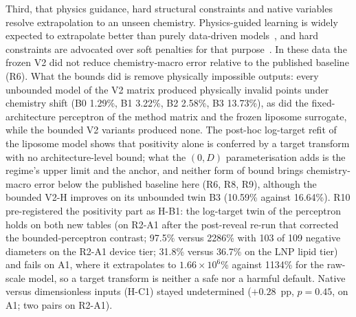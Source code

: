 \documentclass[11pt,a4paper]{article}
\begin{document}
Third, that physics guidance, hard structural constraints and native
variables resolve extrapolation to an unseen chemistry. Physics-guided
learning is widely expected to extrapolate better than purely data-driven
models~\cite{karniadakis2021,willard2022}, and hard constraints are advocated
over soft penalties for that purpose~\cite{naturecs2021,lu2021,beucler2021}.
In these data the frozen V2 did not reduce chemistry-macro error relative to
the published baseline (R6). What the bounds did is remove physically
impossible outputs: every unbounded model of the V2 matrix produced
physically invalid points under chemistry shift (B0 1.29\%, B1 3.22\%, B2
2.58\%, B3 13.73\%), as did the fixed-architecture perceptron of the method
matrix and the frozen liposome surrogate, while the bounded V2 variants
produced none. The post-hoc log-target refit of the liposome model
shows that positivity alone is conferred by a target transform with no
architecture-level bound; what the $(0,D)$ parameterisation adds is the
regime's upper limit and the anchor, and neither form of bound brings
chemistry-macro error below the published baseline here (R6, R8, R9), although
the bounded V2-H improves on its unbounded twin B3 (10.59\% against 16.64\%). R10 pre-registered the positivity part as \mbox{H-B1}: the
log-target twin of the perceptron holds on both new tables (on R2-A1 after the
post-reveal re-run that corrected the bounded-perceptron contrast; 97.5\% versus
2286\% with 103 of 109 negative diameters on the R2-A1 device tier; 31.8\%
versus 36.7\% on the LNP lipid tier) and fails on A1, where it extrapolates
to $1.66\times10^{6}$\% against 1134\% for the raw-scale model, so a target
transform is neither a safe nor a harmful default. Native versus dimensionless
inputs (\mbox{H-C1}) stayed undetermined ($+0.28$~pp, $p=0.45$, on A1; two pairs on
R2-A1).
\end{document}

